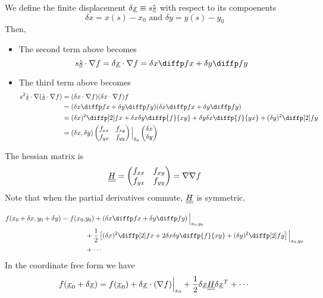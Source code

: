 \documentclass{article}
\begin{document}
We define the finite displacement $\delta \underline{x} \equiv s \hat{\underline{s}}$ with respect to its compoenents
\[
    \delta x = x(s) - x_0 \text{ and } \delta y = y(s) - y_0
\]
Then,
\begin{itemize}
    \item The second term above becomes
    \[
        s \uvec s \cdot \nabla f = \delta \vec x \cdot \nabla f = \delta x \diffp fx + \delta y \diffp fy
    \]
    \item The third term above becomes
    \begin{align*}
        s^2 \uvec s \cdot \nabla(\uvec s \cdot \nabla f) &= (\delta x \cdot \nabla f)(\delta x \cdot \nabla f) f \\
        &= (\delta x \diffp fx + \delta y \diffp fy)(\delta x \diffp fx + \delta y \diffp fy) \\
        &= (\delta x)^2 \diffp[2] fx + \delta x \delta y \diffp{f}{{x}{y}} + \delta y \delta x \diffp{f}{{y}{x}} + (\delta y)^2 \diffp[2] fy \\
        &= (\delta x, \delta y) \begin{pmatrix}
            f_{xx} & f_{xy} \\
            f_{yx} & f_{yy}
        \end{pmatrix} \eval_{\vec x_0}{}
        \begin{pmatrix}
            \delta x \\ \delta y
        \end{pmatrix}
    \end{align*}
\end{itemize}

\begin{defi}
    The hessian matrix is
    \[
        \underline{\underline{H}} = \begin{pmatrix}
            f_{xx} & f_{xy} \\
            f_{yx} & f_{yy}
        \end{pmatrix} = \nabla \nabla f
    \]
    Note that when the partial derivatives commute, $\underline{\underline{H}}$ is symmetric.
\end{defi}

\begin{defi}
    \begin{align*}
        f(x_0 + \delta x, y_0 + \delta y) = f(x_0, &y_0) + \bkt{\delta x \diffp fx + \delta y \diffp fy}\eval_{x_0, y_0}{} \\
        &+ \frac{1}{2} \sqbkt{(\delta x)^2 \diffp[2] fx + 2\delta x \delta y \diffp{f}{{x}{y}} + (\delta y)^2 \diffp[2] fy}\eval_{x_0, y_0}{} \\
        &+ \cdots
    \end{align*}
    In the coordinate free form we have
    \[
        f(\underline{x}_0 + \delta \underline{x}) = f(\underline{x}_0) + \delta \underline{x} \cdot (\nabla f) \Big{|}_{x_0}{} + \frac{1}{2} \delta \underline{x} \underline{\underline{H}} \delta \underline{x}^T + \cdots 
    \]
\end{defi}
\end{document}

